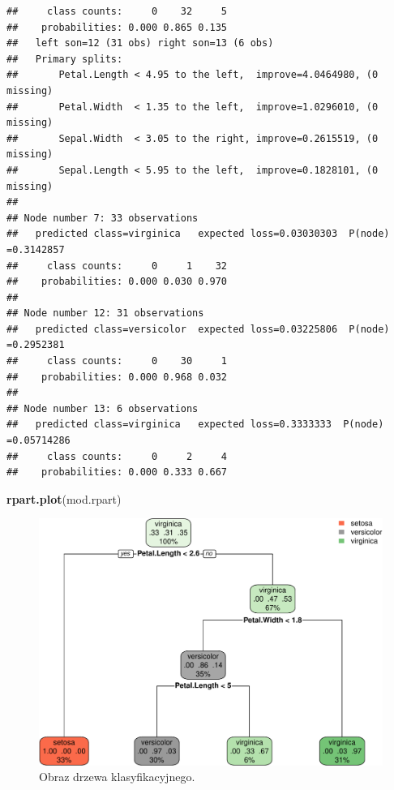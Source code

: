 \documentclass[
]{book}
\newenvironment{Shaded}{\begin{snugshade}}{\end{snugshade}}
\newcommand{\KeywordTok}[1]{\textcolor[rgb]{0.13,0.29,0.53}{\textbf{#1}}}
\newcommand{\NormalTok}[1]{#1}
\theoremstyle{plain}
\theoremstyle{definition}
\theoremstyle{definition}
\theoremstyle{definition}
\theoremstyle{definition}
\theoremstyle{remark}
\begin{document}
\begin{verbatim}
##     class counts:     0    32     5
##    probabilities: 0.000 0.865 0.135 
##   left son=12 (31 obs) right son=13 (6 obs)
##   Primary splits:
##       Petal.Length < 4.95 to the left,  improve=4.0464980, (0 missing)
##       Petal.Width  < 1.35 to the left,  improve=1.0296010, (0 missing)
##       Sepal.Width  < 3.05 to the right, improve=0.2615519, (0 missing)
##       Sepal.Length < 5.95 to the left,  improve=0.1828101, (0 missing)
## 
## Node number 7: 33 observations
##   predicted class=virginica   expected loss=0.03030303  P(node) =0.3142857
##     class counts:     0     1    32
##    probabilities: 0.000 0.030 0.970 
## 
## Node number 12: 31 observations
##   predicted class=versicolor  expected loss=0.03225806  P(node) =0.2952381
##     class counts:     0    30     1
##    probabilities: 0.000 0.968 0.032 
## 
## Node number 13: 6 observations
##   predicted class=virginica   expected loss=0.3333333  P(node) =0.05714286
##     class counts:     0     2     4
##    probabilities: 0.000 0.333 0.667
\end{verbatim}

\begin{Shaded}
\begin{Highlighting}[]
\KeywordTok{rpart.plot}\NormalTok{(mod.rpart)}
\end{Highlighting}
\end{Shaded}

\begin{figure}
\centering
\includegraphics{EksploracjaDanych_files/figure-latex/unnamed-chunk-15-1.pdf}
\caption{\label{fig:unnamed-chunk-15}Obraz drzewa klasyfikacyjnego.}
\end{figure}
\end{document}
